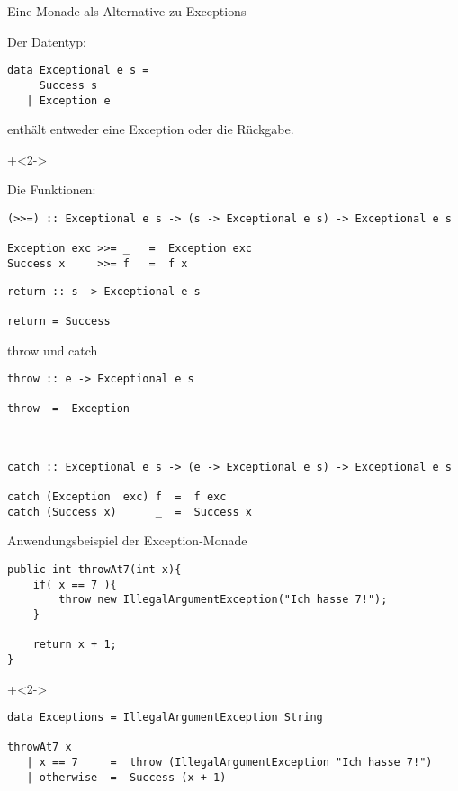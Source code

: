 \begin{frame}[fragile]{Eine Monade als Alternative zu Exceptions}

Der Datentyp:
\begin{lstlisting}
data Exceptional e s =
     Success s
   | Exception e
\end{lstlisting}

enthält entweder eine Exception oder die Rückgabe.

\onslide+<2->

Die Funktionen:
\begin{lstlisting}
(>>=) :: Exceptional e s -> (s -> Exceptional e s) -> Exceptional e s

Exception exc >>= _   =  Exception exc
Success x     >>= f   =  f x
\end{lstlisting}


\begin{lstlisting}
return :: s -> Exceptional e s

return = Success
\end{lstlisting}
\end{frame}

\begin{frame}[fragile]{throw und catch}
\begin{lstlisting}
throw :: e -> Exceptional e s

throw  =  Exception
\end{lstlisting}

~

\begin{lstlisting}
catch :: Exceptional e s -> (e -> Exceptional e s) -> Exceptional e s

catch (Exception  exc) f  =  f exc
catch (Success x)      _  =  Success x
\end{lstlisting}

\end{frame}


\begin{frame}[fragile]{Anwendungsbeispiel der Exception-Monade}
\begin{lstlisting}
public int throwAt7(int x){
    if( x == 7 ){
        throw new IllegalArgumentException("Ich hasse 7!");
    }
    
    return x + 1;
}
\end{lstlisting}

\onslide+<2->

\begin{lstlisting}
data Exceptions = IllegalArgumentException String

throwAt7 x
   | x == 7     =  throw (IllegalArgumentException "Ich hasse 7!")
   | otherwise  =  Success (x + 1)
\end{lstlisting}


\end{frame}


